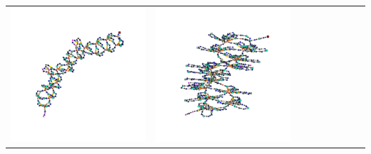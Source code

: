 \begin{table}[t!]
\begin{tabular}{p{1.7cm}ccp{0.2cm}ccccc}
		{\includegraphics[width=\width,align=c,trim={2.3cm 3cm 2.3cm 3cm},clip]{dag_ood_deep36_0.pdf}} & 
		\includegraphics[width=\width,align=c,trim={2.3cm 3cm 2.3cm 3cm},clip]{dag_ood_conn_0.pdf} & 

\end{tabular}
\end{table}

